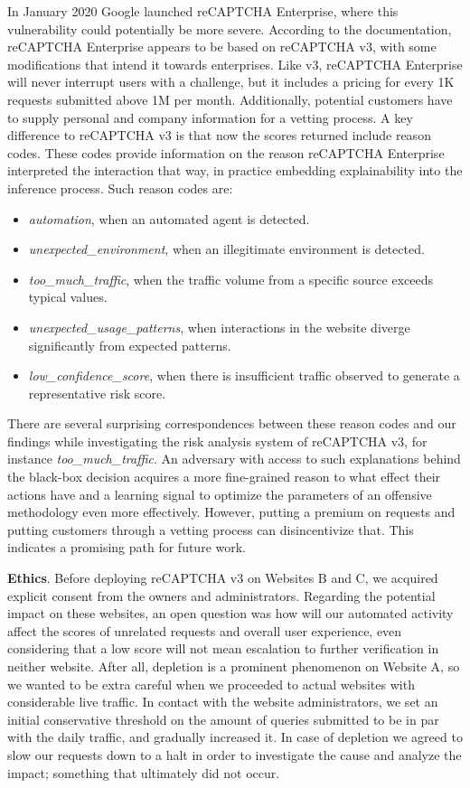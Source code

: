 In January 2020 Google launched reCAPTCHA Enterprise, where this vulnerability could potentially be more severe.
According to the documentation, reCAPTCHA Enterprise appears to be based on reCAPTCHA v3, with some modifications that intend it towards enterprises.
Like v3, reCAPTCHA Enterprise will never interrupt users with a challenge, but it includes a pricing for every 1K requests submitted above 1M per month.
Additionally, potential customers have to supply personal and company information for a vetting process.
A key difference to reCAPTCHA v3 is that now the scores returned include reason codes.
These codes provide information on the reason reCAPTCHA Enterprise interpreted the interaction that way, in practice embedding explainability into the inference process.
Such reason codes are:
\begin{itemize}
  \item \textit{automation}, when an automated agent is detected.
  \item \textit{unexpected\_environment}, when an illegitimate environment is detected.
  \item \textit{too\_much\_traffic}, when the traffic volume from a specific source exceeds typical values.
  \item \textit{unexpected\_usage\_patterns}, when interactions in the website diverge significantly from expected patterns.
  \item \textit{low\_confidence\_score}, when there is insufficient traffic observed to generate a representative risk score.
\end{itemize}
There are several surprising correspondences between these reason codes and our findings while investigating the risk analysis system of reCAPTCHA v3, for instance \textit{too\_much\_traffic}.
An adversary with access to such explanations behind the black-box decision acquires a more fine-grained reason to what effect their actions have and a learning signal to optimize the parameters of an offensive methodology even more effectively.
However, putting a premium on requests and putting customers through a vetting process can disincentivize that.
This indicates a promising path for future work.

\textbf{Ethics}.
Before deploying reCAPTCHA v3 on Websites B and C, we acquired explicit consent from the owners and administrators.
Regarding the potential impact on these websites, an open question was how will our automated activity affect the scores of unrelated requests and overall user experience, even considering that a low score will not mean escalation to further verification in neither website.
After all, depletion is a prominent phenomenon on Website A, so we wanted to be extra careful when we proceeded to actual websites with considerable live traffic.
In contact with the website administrators, we set an initial conservative threshold on the amount of queries submitted to be in par with the daily traffic, and gradually increased it.
In case of depletion we agreed to slow our requests down to a halt in order to investigate the cause and analyze the impact; something that ultimately did not occur.

